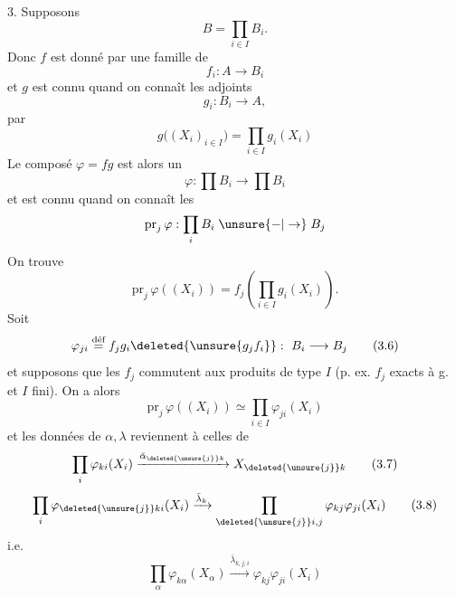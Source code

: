 3. Supposons
\[
 \boxed{B=\prod_{i\in I}B_i}. \tag*{(3.1)}
\]
Donc $f$ est donné par une famille de
\[
 f_i:A\longrightarrow B_i \tag*{(3.2)}
\]
et $g$ est connu quand on connaît les adjoints
\[
 g_i:B_i\longrightarrow A, \tag*{(3.3)}
\]
par
\[
 g\bigl((X_i)_{i\in I}\bigr)=\prod_{i\in I}g_i(X_i) \tag*{(3.4)}
\]
Le composé $\varphi=fg$ est alors un 
\[
 \varphi:\prod B_i\longrightarrow\prod B_i
\]
et est connu quand on connaît les
\[
 \mathrm{pr}_{j}\,\varphi:\prod_i B_i\mathrel{\unsure{-|\to}}B_j
\]
On trouve
\[
 \mathrm{pr}_j\,\varphi((X_i))=f_j\left(\prod_{i\in I}g_i(X_i)\right). \tag*{(3.5)}
\]
Soit
\[
 \varphi_{ji}\overset{\text{déf}}{=}f_jg_i\deleted{\unsure{g_j f_i}}:\ B_i\longrightarrow B_j \tag*{(3.6)}
\]
et supposons que les $f_j$ commutent aux produits de type $I$ (p. ex. $f_j$ exacts à g. et $I$ fini). On a alors
\[
 \mathrm{pr}_j\,\varphi((X_i))\simeq\prod_{i\in I}\varphi_{ji}(X_i) \tag*{(3.6)}
\]
et les données de $\alpha,\lambda$ reviennent à celles de
\[
 \prod_i\varphi_{ki}(X_i)\xrightarrow{\bar\alpha_{\deleted{\unsure{j}}k}}X_{\deleted{\unsure{j}}k} \tag*{(3.7)}
\]
\[
 \prod_i\varphi_{\deleted{\unsure{j}}ki}(X_i)\xrightarrow{\bar\lambda_k}
 \prod_{\deleted{\unsure{j}}i,j}\varphi_{kj}\varphi_{ji}(X_i) \tag*{(3.8)}
\]
i.e.
\[
 \prod_\alpha\varphi_{k\alpha}(X_\alpha)\xrightarrow{\bar\lambda_{k,j,i}}\varphi_{kj}\varphi_{ji}(X_i)
\]
